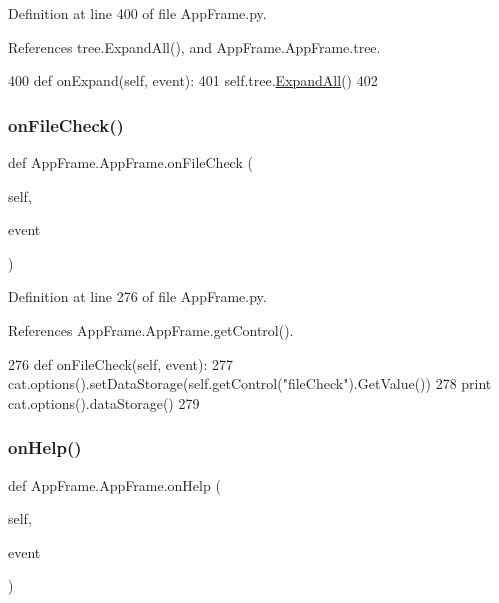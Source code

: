 Definition at line 400 of file App\+Frame.\+py.



References tree.\+Expand\+All(), and App\+Frame.\+App\+Frame.\+tree.


\begin{DoxyCode}
400     \textcolor{keyword}{def }onExpand(self, event):
401         self.tree.\hyperlink{namespacetree_a68fefd05a9fba45bef73547aabebed51}{ExpandAll}()
402 
\end{DoxyCode}
\mbox{\label{classAppFrame_1_1AppFrame_ae832c27d48d36bf3c50a709db009c2a1}} 
\subsubsection{\texorpdfstring{on\+File\+Check()}{onFileCheck()}}
{\footnotesize\ttfamily def App\+Frame.\+App\+Frame.\+on\+File\+Check (\begin{DoxyParamCaption}\item[{}]{self,  }\item[{}]{event }\end{DoxyParamCaption})}



Definition at line 276 of file App\+Frame.\+py.



References App\+Frame.\+App\+Frame.\+get\+Control().


\begin{DoxyCode}
276     \textcolor{keyword}{def }onFileCheck(self, event):
277         cat.options().setDataStorage(self.getControl(\textcolor{stringliteral}{"fileCheck"}).GetValue())
278         \textcolor{keywordflow}{print} cat.options().dataStorage()
279         
\end{DoxyCode}
\mbox{\label{classAppFrame_1_1AppFrame_ab6921bc4674e0a2ff0c7d1e96e9b989c}} 
\subsubsection{\texorpdfstring{on\+Help()}{onHelp()}}
{\footnotesize\ttfamily def App\+Frame.\+App\+Frame.\+on\+Help (\begin{DoxyParamCaption}\item[{}]{self,  }\item[{}]{event }\end{DoxyParamCaption})}

